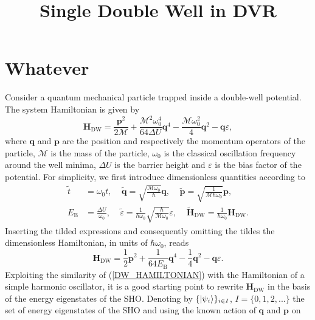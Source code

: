 \documentclass[11pt]{article}
\title{Single Double Well in DVR}
\begin{document}
\maketitle

\section{Whatever}

Consider a quantum mechanical particle trapped inside a double-well potential. The system
Hamiltonian is given by 
%
\begin{equation}\label{DW_HAMILTONIAN}
    \mathbf{H}_{\text{DW}} = \frac{\mathbf{p}^2}{2\mathcal{M}} + \frac{\mathcal{M}^2\omega_0^4}{64\Delta U}\mathbf{q}^4
    - \frac{\mathcal{M}\omega_0^2}{4}\mathbf{q}^2 -\mathbf{q}\varepsilon,
\end{equation}
%
where $\mathbf{q}$ and $\mathbf{p}$ are the position and respectively the momentum operators of 
the particle, $\mathcal{M}$ is the mass of the particle, $\omega_0$ is the classical 
oscillation frequency around the well minima, $\Delta U$ is the barrier height and
$\varepsilon$ is the bias factor of the potential. 
For simplicity, we first introduce dimensionless quantities according to
%
\begin{align}
    \tilde{t}&=\omega_0t, \ \ \ \ \ \tilde{\mathbf{q}}=\sqrt{\frac{\mathcal{M}\omega_0}{\hbar}}\mathbf{q},
    \ \ \ \ \ \tilde{\mathbf{p}}=\sqrt{\frac{1}{\mathcal{M}\hbar\omega_0}}\mathbf{p}, \\
    E_{\text{B}}&=\frac{\Delta U}{\omega_0}, \ \ \ \ \ \tilde{\varepsilon}=\frac{1}{\hbar\omega_0}\sqrt{\frac{\hbar}{\mathcal{M}\omega_0}}\varepsilon,
    \ \ \ \ \ \tilde{\mathbf{H}}_{\text{DW}}=\frac{1}{\hbar\omega_0}\mathbf{H}_{\text{DW}}.
\end{align}
%
Inserting the tilded expressions and consequently omitting the tildes the dimensionless 
Hamiltonian, in units of $\hbar\omega_0$, reads
%
\begin{equation}
    \mathbf{H}_{\text{DW}} = \frac{1}{2}\mathbf{p}^2+\frac{1}{64E_{\text{B}}}\mathbf{q}^4-\frac{1}{4}\mathbf{q}^2 -\mathbf{q}\varepsilon.
\end{equation}
%
Exploiting the similarity of
(\ref{DW_HAMILTONIAN}) with the Hamiltonian of a simple harmonic oscillator, it is a good
starting point to rewrite $\mathbf{H}_{\text{DW}}$ in the basis of the energy eigenstates of
the SHO. Denoting by $\{ \ket{\psi_i} \}_{i \in I}$, $I=\{ 0,1,2,... \}$ the set of energy
eigenstates of the SHO and using the known action of $\mathbf{q}$ and $\mathbf{p}$ on 
\end{document}
